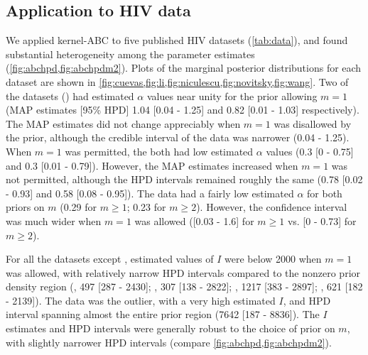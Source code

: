 %
%
%    

\subsection{Application to HIV data}



We applied kernel-ABC to five published HIV datasets (\cref{tab:data}),
and found substantial heterogeneity among the parameter estimates
(\cref{fig:abchpd,fig:abchpdm2}). Plots of the marginal posterior distributions
for each dataset are shown in
\cref{fig:cuevas,fig:li,fig:niculescu,fig:novitsky,fig:wang}.
Two of the datasets (\textcite{niculescu2015recent, wang2015targeting}) had
estimated $\alpha$ values near unity for the prior allowing $m = 1$ (\gls{MAP}
estimates [95\% \gls{HPD}] 
  1.04 
  [0.04 - 
   1.25]
and
  0.82 
  [0.01 -
   1.03] respectively).
The MAP estimates did not change appreciably when $m = 1$ was disallowed by the
prior, although the credible interval of the \textcite{niculescu2015recent}
data was narrower
  (0.04 - 
   1.25).
When $m = 1$ was permitted, the \textcite{li2015hiv, cuevas2009hiv} both had
low estimated $\alpha$ values
  (0.3 
  [0 - 
  0.75]
and
  0.3 
  [0.01 -
   0.79]). 
However, the MAP estimates increased when $m = 1$ was not permitted, although
the HPD intervals remained roughly the same
  (0.78 
  [0.02 - 
  0.93]
and
  0.58 
  [0.08 -
   0.95]).
The \textcite{novitsky2014impact} data had a fairly low estimated $\alpha$
for both priors on $m$
  (0.29 for $m \geq 1$;
   0.23 for $m \geq 2$).
However, the confidence interval was much wider when $m = 1$ was allowed
  ([0.03 -
    1.6] for $m \geq 1$ vs.
   [0 -
    0.73] for $m \geq 2$).

For all the datasets except \citeauthor{novitsky2014impact}, estimated values
of $I$ were below 2000 when $m = 1$ was allowed, with relatively narrow HPD
intervals compared to the nonzero prior density region
  (\citeauthor{cuevas2009hiv}, 497 
  [287 -
   2430];
   \citeauthor{niculescu2015recent}, 307
  [138 - 
   2822];
  \citeauthor{li2015hiv}, 1217 
  [383 -
   2897];
   \citeauthor{wang2015targeting}, 621
  [182 - 
   2139]).
The \citeauthor{novitsky2014impact} data was the outlier, with a very high
estimated $I$, and HPD interval spanning almost the entire prior region
  (7642 
  [187 -
   8836]).
The $I$ estimates and HPD intervals were generally robust to the choice of
prior on $m$, with slightly narrower HPD intervals (compare
\cref{fig:abchpd,fig:abchpdm2}).

